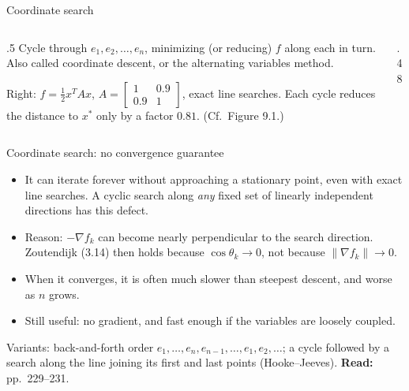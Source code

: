 \documentclass[12pt,aspectratio=169]{beamer}
\newcommand{\readpp}[1]{{\color{red!80!black}\textbf{Read:} #1}}
\begin{document}
\begin{frame}{Coordinate search}
  \begin{columns}[c]
    \begin{column}{.5\textwidth}
      Cycle through $e_1,e_2,\dots,e_n$, minimizing (or reducing) $f$ along each in turn.
      Also called coordinate descent, or the alternating variables method.

      \vspace{1ex}
      Right: $f=\tfrac12x^TAx$, $A=\begin{bmatrix}1&0.9\\0.9&1\end{bmatrix}$, exact line searches.
      Each cycle reduces the distance to $x^*$ only by a factor $0.81$. (Cf.\ Figure 9.1.)
    \end{column}
    \begin{column}{.48\textwidth}
      \centering
    \end{column}
  \end{columns}
\end{frame}

\begin{frame}{Coordinate search: no convergence guarantee}
  \begin{itemize}
    \item It can iterate forever without approaching a stationary point, even with exact line searches.
      A cyclic search along \emph{any} fixed set of linearly independent directions has this defect.
    \item Reason: $-\nabla f_k$ can become nearly perpendicular to the search direction.
      Zoutendijk (3.14) then holds because $\cos\theta_k\to0$, not because $\|\nabla f_k\|\to0$.
    \item When it converges, it is often much slower than steepest descent, and worse as $n$ grows.
    \item Still useful: no gradient, and fast enough if the variables are \alert{loosely coupled}.
  \end{itemize}
  Variants: back-and-forth order $e_1,\dots,e_n,e_{n-1},\dots,e_1,e_2,\dots$;
  a cycle followed by a search along the line joining its first and last points (Hooke--Jeeves).
  \readpp{pp.~229--231.}
\end{frame}
\end{document}
